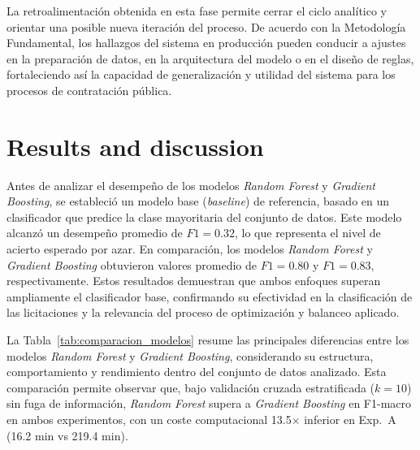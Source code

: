 \documentclass[a4paper,fleqn]{cas-sc}
\begin{document}
La retroalimentación obtenida en esta fase permite cerrar el ciclo analítico y orientar una posible nueva iteración del proceso. De acuerdo con la Metodología Fundamental, los hallazgos del sistema en producción pueden conducir a ajustes en la preparación de datos, en la arquitectura del modelo o en el diseño de reglas, fortaleciendo así la capacidad de generalización y utilidad del sistema para los procesos de contratación pública.


 \section{Results and discussion}

 
 Antes de analizar el desempeño de los modelos \textit{Random Forest} y \textit{Gradient Boosting}, 
 se estableció un modelo base (\textit{baseline}) 
 de referencia,  basado en un clasificador que predice la clase mayoritaria del conjunto de datos. 
 Este modelo alcanzó un desempeño promedio de $F1 = 0.32$, lo que representa el nivel de acierto esperado por azar. 
 En comparación, los modelos \textit{Random Forest} y \textit{Gradient Boosting} obtuvieron valores promedio de $F1 = 0.80$ y $F1 = 0.83$, respectivamente. 
 Estos resultados demuestran que ambos enfoques superan ampliamente el clasificador base, confirmando su efectividad en la clasificación de las licitaciones y la relevancia del proceso de optimización y balanceo aplicado.


 	La Tabla~\ref{tab:comparacion_modelos} resume las principales diferencias entre los modelos \textit{Random Forest} y \textit{Gradient Boosting}, considerando su estructura, comportamiento y rendimiento dentro del conjunto de datos analizado. 
 	Esta comparación permite observar que, bajo validación cruzada estratificada ($k=10$) sin fuga de información, \textit{Random Forest} supera a \textit{Gradient Boosting} en F1-macro en ambos experimentos, con un coste computacional 13.5$\times$ inferior en Exp.~A (16.2 min vs 219.4 min).

 
 
\end{document}
